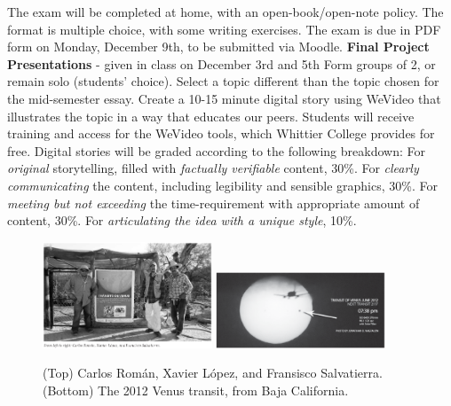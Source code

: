 \documentclass[10pt]{article}
\begin{document}
\begin{outline}[enumerate]
\2 The exam will be completed at home, with an open-book/open-note policy.  The format is multiple choice, with some writing exercises.
\2 The exam is due in PDF form on Monday, December 9th, to be submitted via Moodle.
\1 \textbf{Final Project Presentations} - given in class on December 3rd and 5th
\2 Form groups of 2, or remain solo (students' choice).
\2 Select a topic different than the topic chosen for the mid-semester essay.
\2 Create a 10-15 minute digital story using WeVideo that illustrates the topic in a way that educates our peers.
\2 Students will receive training and access for the WeVideo tools, which Whittier College provides for free.
\2 Digital stories will be graded according to the following breakdown:
\3 For \textit{original} storytelling, filled with \textit{factually verifiable} content, 30\%.
\3 For \textit{clearly communicating} the content, including legibility and sensible graphics, 30\%.
\3 For \textit{meeting but not exceeding} the time-requirement with appropriate amount of content, 30\%.
\3 For \textit{articulating the idea with a unique style}, 10\%.
\end{outline}
\begin{figure}[hb]
\centering
\includegraphics[width=0.45\textwidth]{figures/roman_lopez_salvatierra.png}
\includegraphics[width=0.45\textwidth]{figures/venus.png}
\caption{\label{fig:franklin2} (Top) Carlos Rom\'{a}n, Xavier L\'{o}pez, and Fransisco Salvatierra. (Bottom) The 2012 Venus transit, from Baja California.}
\end{figure}
\end{document}
